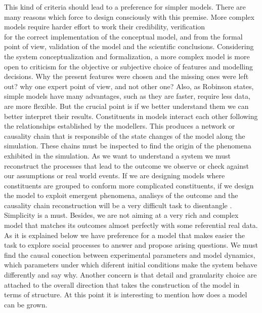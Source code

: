 \documentclass[11pt,oneside,a4paper,openright]{report}
\begin{document}
This kind of criteria should lead to a preference for simpler models. There are many reasons which force to design consciously with this premise. More complex models require harder effort to work their credibility, verification\\  for the correct implementation of the conceptual model, and from the formal point of view, validation of the model and the scientific conclusions. Considering the system conceptualization and formalization, a more complex model is more open to criticism for the objective or subjective choice of features and modelling decisions. Why the present features were chosen and the missing ones were left out? why one expert point of view, and not other one? Also, as Robinson \cite{Robinson2008} states, simple models have many advantages, such as they are faster, require less data, are more flexible. But the crucial point is if we better understand them we can better interpret their results. Constituents in models interact each other following the relationships established by the modellers. This produces a network or causality chain that is responsible of the state changes of the model along the simulation. These chains must be inspected to find the origin of the phenomena exhibited in the simulation. As we want to understand a system we must reconstruct the processes that lead to the outcome we observe or check against our assumptions or real world events. If we are designing models where constituents are grouped to conform more complicated constituents, if we design the model to exploit emergent phenomena, analisys of the outcome and the causality chain reconstruction will be a very difficult task to disentangle \cite[p.31]{Premo2010}\label{myPremo_simplicity}. Simplicity is a must. Besides, we are not aiming at a very rich and complex model that matches its outcomes almost perfectly with some referential real data. As it is explained below we have preference for a model that makes easier the task to explore social processes to answer and propose arising questions. We must find the causal conection between experimental parameters and model dynamics, which parameters under which diferent initial conditions make the system behave differently and say why.
Another concern is that detail and granularity choice are attached to the overall direction that takes the construction of the model in terms of structure. At this point it is interesting to mention how does a model can be grown.\\
\end{document}
